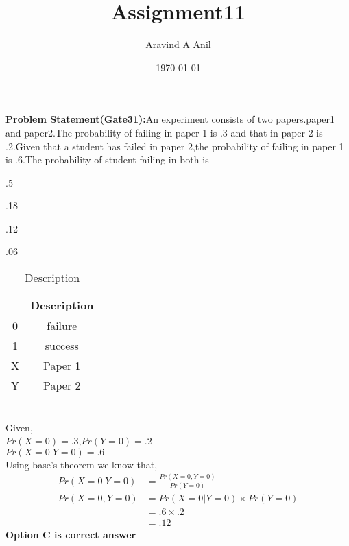\documentclass[11pt,a4paper,twocolumn]{article}
\title{Assignment11}
\author{Aravind A Anil}
\date{\today}
\begin{document}
\maketitle
\textbf{Problem Statement(Gate31):}An experiment consists of two papers.paper1 and paper2.The probability of failing in paper 1 is .3 and that in paper 2 is .2.Given that a student has failed in paper 2,the probability of failing in paper 1 is .6.The probability of student failing in both is\\
\begin{enumerate*}[label=\Alph*)]
\item .5 \hspace{.5cm}
\item .18 \hspace{.5cm}
\item .12 \hspace{.5cm}
\item .06 \hspace{.5cm}
\end{enumerate*}
\begin{table}[ht]
    \centering
    \begin{tabular}{|c|c|}
    \hline
         &Description  \\
         \hline
         0&failure\\
         \hline
         1&success\\
         \hline
         X&Paper 1\\
         \hline
         Y&Paper 2\\
         \hline
    \end{tabular}
    \caption{Description}
\end{table}
\\Given,\\
$Pr(X=0)=.3$,$Pr(Y=0)=.2$\\
$Pr(X=0|Y=0)=.6$\\
Using base's theorem we know that,\\
\begin{align*}
 Pr(X=0|Y=0)&=\frac{Pr(X=0,Y=0)}{Pr(Y=0)}\\ 
 Pr(X=0,Y=0)&=Pr(X=0|Y=0)\times Pr(Y=0)\\
 &=.6\times.2\\
 &=.12
\end{align*}
\textbf{Option C is correct answer}
\\
\end{document}
